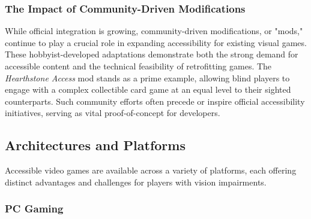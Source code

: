 \subsubsection{The Impact of Community-Driven Modifications}

While official integration is growing, community-driven modifications, or "mods," continue to play a crucial role in expanding accessibility for existing visual games. These hobbyist-developed adaptations demonstrate both the strong demand for accessible content and the technical feasibility of retrofitting games. The \textit{Hearthstone Access} mod stands as a prime example, allowing blind players to engage with a complex collectible card game at an equal level to their sighted counterparts\supercite{AFBIntroVG}. Such community efforts often precede or inspire official accessibility initiatives, serving as vital proof-of-concept for developers.

\subsection{Architectures and Platforms}

Accessible video games are available across a variety of platforms, each offering distinct advantages and challenges for players with vision impairments.

\subsubsection{PC Gaming}

